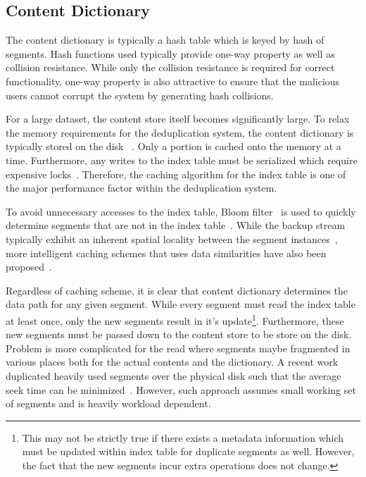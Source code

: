 \subsection{Content Dictionary}
The content dictionary is typically a hash table which is keyed by hash of segments. Hash functions used typically provide one-way property as well as collision resistance. While only the collision resistance is required for correct functionality, one-way property is also attractive to ensure that the malicious users cannot corrupt the system by generating hash collisions.

For a large dataset, the content store itself becomes significantly large. 
To relax the memory requirements for the deduplication system, the content dictionary is typically stored on the disk~\cite{mandagere:2008, lillibridge:2009, zhu:2008, bhagwat:2009} . 
Only a portion is cached onto the memory at a time. Furthermore, any writes to the index table must be serialized which require expensive locks~\cite{clements:2009}. Therefore, the caching algorithm for the index table is one of the major performance factor within the deduplication system.

To avoid unnecessary accesses to the index table, Bloom filter~\cite{bloom:1970} is used to quickly determine segments that are not in the index table~\cite{zhu:2008}. While the backup stream typically exhibit an inherent spatial locality between the segment instances~\cite{zhu:2008}, more intelligent caching schemes that uses data similarities have also been proposed~\cite{lillibridge:2009, bhagwat:2009}.

Regardless of caching scheme, it is clear that content dictionary determines the data path for any given segment. While every segment must read the index table at least once, only the new segments result in it's update\footnote{This may not be strictly true if there exists a metadata information which must be updated within index table for duplicate segments as well. However, the fact that the new segments incur extra operations does not change.}. Furthermore, these new segments must be passed down to the content store to be store on the disk. Problem is more complicated for the read where segments maybe fragmented in various places both for the actual contents and the dictionary. A recent work duplicated heavily used segments over the physical disk such that the average seek time can be minimized~\cite{koller:2010}. However, such approach assumes small working set of segments and is heavily workload dependent.

